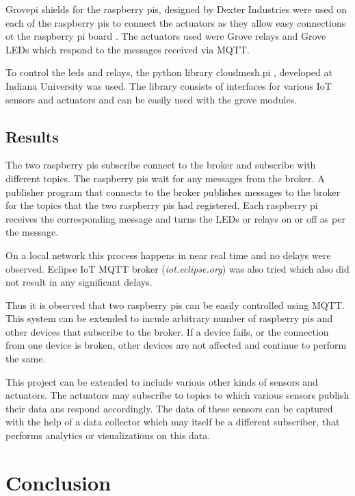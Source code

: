 \documentclass[sigconf]{acmart}
\begin{document}
Grovepi shields for the raspberry pis, designed by Dexter Industries
were used on each of the raspberry pis to connect the actuators as
they allow easy connections ot the raspberry pi board \cite{grovepi}.
The actuators used were Grove relays \cite{grove-relay} and Grove LEDs
\cite{grove-led} which respond to the messages received via MQTT.

To control the leds and relays, the python library cloudmesh.pi
\cite{cloudmesh.pi}, developed at Indiana University was used. The
library consists of interfaces for various IoT sensors and actuators
and can be easily used with the grove modules.



\subsection{Results}

The two raspberry pis subscribe connect to the broker and subscribe
with different topics. The raspberry pis wait for any messages from
the broker. A publisher program that connects to the broker publishes
messages to the broker for the topics that the two raspberry pis had
registered. Each raspberry pi receives the corresponding message and
turns the LEDs or relays on or off as per the message.

On a local network this process happens in near real time and no
delays were observed. Eclipse IoT MQTT broker ({\em iot.eclipse.org})
was also tried which also did not result in any significant delays.

Thus it is observed that two raspberry pis can be easily controlled
using MQTT. This system can be extended to incude arbitrary number of
raspberry pis and other devices that subscribe to the broker. If a
device fails, or the connection from one device is broken, other
devices are not affected and continue to perform the same.

This project can be extended to include various other kinds of sensors
and actuators. The actuators may subscribe to topics to which various
sensors publish their data ans respond accordingly. The data of these
sensors can be captured with the help of a data collector which may
itself be a different subscriber, that performs analytics or
visualizations on this data.


\section{Conclusion}
\end{document}
